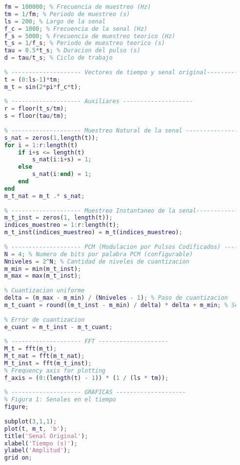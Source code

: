\documentclass[12pt]{article}
\begin{document}
\begin{lstlisting}[language=MATLAB, caption=Código en MATLAB, label=lst:codigo]
    % -------------------- Parametros de configuracion --------------------
    fm = 100000; % Frecuencia de muestreo (Hz)
    tm = 1/fm; % Periodo de muestreo (s)
    ls = 200; % Largo de la senal
    f_c = 1000; % Frecuencia de la senal (Hz)
    f_s = 5000; % Frecuencia de muestreo teorico (Hz)
    t_s = 1/f_s; % Periodo de muestreo teorico (s)
    tau = 0.5*t_s; % Duracion del pulso (s)
    d = tau/t_s; % Ciclo de trabajo
    
    % -------------------- Vectores de tiempo y senal original--------------------
    t = (0:ls-1)*tm;
    m_t = sin(2*pi*f_c*t);
    
    % -------------------- Auxiliares --------------------
    r = floor(t_s/tm);
    s = floor(tau/tm);
    
    % -------------------- Muestreo Natural de la senal --------------------
    s_nat = zeros(1,length(t));
    for i = 1:r:length(t)
        if i+s <= length(t)
            s_nat(i:i+s) = 1;
        else
            s_nat(i:end) = 1;
        end
    end
    m_t_nat = m_t .* s_nat;
    
    % -------------------- Muestreo Instantaneo de la senal--------------------
    m_t_inst = zeros(1, length(t));
    indices_muestreo = 1:r:length(t);
    m_t_inst(indices_muestreo) = m_t(indices_muestreo);
    
    % -------------------- PCM (Modulacion por Pulsos Codificados) --------------------
    N = 4; % Numero de bits por palabra PCM (configurable)
    Nniveles = 2^N; % Cantidad de niveles de cuantizacion
    m_min = min(m_t_inst);
    m_max = max(m_t_inst);
    
    % Cuantizacion uniforme
    delta = (m_max - m_min) / (Nniveles - 1); % Paso de cuantizacion
    m_t_cuant = round((m_t_inst - m_min) / delta) * delta + m_min; % Senal cuantizada
    
    % Error de cuantizacion
    e_cuant = m_t_inst - m_t_cuant;
    
    % -------------------- FFT --------------------
    M_t = fft(m_t);
    M_t_nat = fft(m_t_nat);
    M_t_inst = fft(m_t_inst);
    % Frequency axis for plotting
    f_axis = (0:(length(t) - 1)) * (1 / (ls * tm));
    
    % -------------------- GRAFICAS --------------------
    % Figura 1: Senales en el tiempo
    figure;
    
    subplot(3,1,1);
    plot(t, m_t, 'b');
    title('Senal Original');
    xlabel('Tiempo (s)');
    ylabel('Amplitud');
    grid on;
    

\end{lstlisting}
\end{document}
